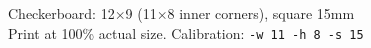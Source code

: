 \documentclass{article}
\begin{document}
\begin{center}

\vspace{3mm}
{\large Checkerboard: 12$\times$9 (11$\times$8 inner corners), square 15mm}\\[1mm]
{\small Print at 100\% actual size. Calibration: \texttt{-w 11 -h 8 -s 15}}
\end{center}
\end{document}
